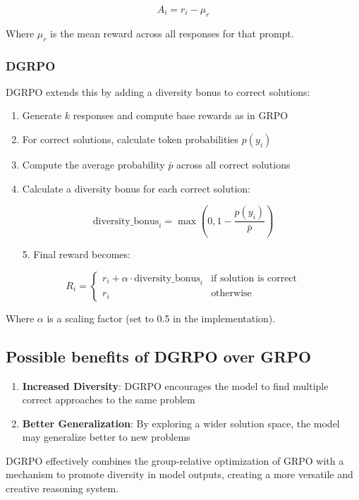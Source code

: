 \documentclass[10pt,twocolumn,letterpaper]{article}
\begin{document}
$$A_i = r_i - \mu_r$$

Where $\mu_r$ is the mean reward across all responses for that prompt.

\subsubsection{DGRPO}

DGRPO extends this by adding a diversity bonus to correct solutions:

\begin{enumerate}
  \item Generate $k$ responses and compute base rewards as in GRPO
  \item For correct solutions, calculate token probabilities $p(y_i)$
  \item Compute the average probability $\bar{p}$ across all correct solutions
  \item Calculate a diversity bonus for each correct solution:
\end{enumerate}

$$\text{diversity\_bonus}_i = \max(0, 1 - \frac{p(y_i)}{\bar{p}})$$

\begin{enumerate}
  \item[5.] Final reward becomes:
\end{enumerate}

$$R_i = \begin{cases}
r_i + \alpha \cdot \text{diversity\_bonus}_i & \text{if solution is correct} \\
r_i & \text{otherwise}
\end{cases}$$

Where $\alpha$ is a scaling factor (set to 0.5 in the implementation).
\subsection{Possible benefits of DGRPO over GRPO}

\begin{enumerate}
  \item \textbf{Increased Diversity}: DGRPO encourages the model to find multiple correct approaches to the same problem
  \item \textbf{Better Generalization}: By exploring a wider solution space, the model may generalize better to new problems
\end{enumerate}

DGRPO effectively combines the group-relative optimization of GRPO with a mechanism to promote diversity in model outputs, creating a more versatile and creative reasoning system.
\end{document}
